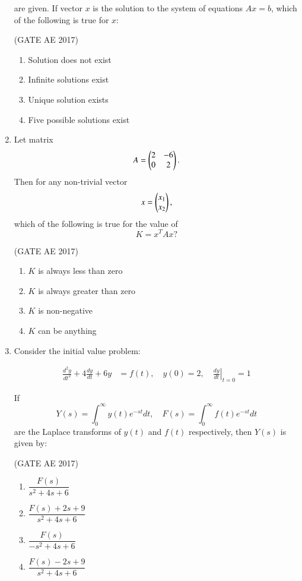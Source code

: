 \documentclass[journal,12pt,onecolumn]{IEEEtran}
\theoremstyle{remark}
\begin{document}
\begin{flushleft}
\begin{enumerate}
are given. If vector $x$ is the solution to the system of equations $A x = b$, which of the following is true for $x$:  

\hfill (GATE AE 2017)

\begin{enumerate}
\item Solution does not exist
\item Infinite solutions exist
\item Unique solution exists
\item Five possible solutions exist
\end{enumerate}
\item Let matrix 
\[
A = \begin{pmatrix}2 & -6 \\ 0 & 2\end{pmatrix}.
\]  
Then for any non-trivial vector 
\[
x = \begin{pmatrix}x_1 \\ x_2\end{pmatrix},
\]  
which of the following is true for the value of  
\[
K = x^T A x ?
\]  

\hfill (GATE AE 2017)

\begin{multicols}{2}
\begin{enumerate}
\item $K$ is always less than zero
\item $K$ is always greater than zero
\item $K$ is non-negative
\item $K$ can be anything
\end{enumerate}
\end{multicols}

\item Consider the initial value problem:  

\begin{align*}
\frac{d^2 y}{dt^2} + 4 \frac{dy}{dt} + 6y &= f(t), \quad y(0)=2, \quad \left. \frac{dy}{dt}\right|_{t=0} = 1
\end{align*}

If 
\[
Y(s) = \int_0^\infty y(t) e^{-st} dt, \quad F(s) = \int_0^\infty f(t) e^{-st} dt
\]  
are the Laplace transforms of $y(t)$ and $f(t)$ respectively, then $Y(s)$ is given by:  

\hfill (GATE AE 2017)

\begin{enumerate}
\item $\dfrac{F(s)}{s^2+4s+6}$
\item $\dfrac{F(s)+2s+9}{s^2+4s+6}$
\item $\dfrac{F(s)}{-s^2+4s+6}$
\item $\dfrac{F(s)-2s+9}{s^2+4s+6}$
\end{enumerate}


\end{enumerate}
\end{flushleft}
\end{document}

